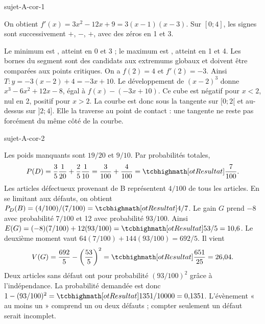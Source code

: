 \begin{blocEdition}{sujet-A-cor-1}

On obtient $f'(x)=3x^2-12x+9=3(x-1)(x-3)$.
Sur $[0;4]$, les signes sont successivement $+$, $-$, $+$, avec des zéros en 1 et 3.
\begin{center}\begin{tableau}
\end{tableau}\end{center}
Le minimum est , atteint en 0 et 3 ; le maximum est , atteint en 1 et 4.
Les bornes du segment sont des candidats aux extremums globaux et doivent être comparées aux points critiques.
On a $f(2)=4$ et $f'(2)=-3$. Ainsi $T:y=-3(x-2)+4=-3x+10$.
Le développement de $(x-2)^3$ donne $x^3-6x^2+12x-8$, égal à $f(x)-(-3x+10)$.
Ce cube est négatif pour $x<2$, nul en 2, positif pour $x>2$.
La courbe est donc sous la tangente sur $[0;2[$ et au-dessus sur $]2;4]$.
Elle la traverse au point de contact : une tangente ne reste pas forcément du même côté de la courbe.

\label{figedition-sujet-A-cor-1-1}
\end{blocEdition}

\begin{blocEdition}{sujet-A-cor-2}

Les poids manquants sont $19/20$ et $9/10$. Par probabilités totales,
\[P(D)=\frac35\frac1{20}+\frac25\frac1{10}=\frac3{100}+\frac4{100}=\res{\frac7{100}}.\]
Les articles défectueux provenant de B représentent $4/100$ de tous les articles.
En se limitant aux défauts, on obtient
$P_D(B)=(4/100)/(7/100)=\res{4/7}$.
Le gain $G$ prend $-8$ avec probabilité $7/100$ et 12 avec probabilité $93/100$.
Ainsi $E(G)=(-8)(7/100)+12(93/100)=\res{53/5=10{,}6}$.
Le deuxième moment vaut $64(7/100)+144(93/100)=692/5$.
Il vient
\[V(G)=\frac{692}{5}-\left(\frac{53}{5}\right)^2=\res{\frac{651}{25}=26{,}04}.\]
Deux articles sans défaut ont pour probabilité $(93/100)^2$ grâce à l'indépendance.
La probabilité demandée est donc $1-(93/100)^2=\res{1351/10000=0{,}1351}$.
L'évènement « au moins un » comprend un ou deux défauts ; compter seulement un défaut serait incomplet.

\label{figedition-sujet-A-cor-2-1}
\end{blocEdition}

